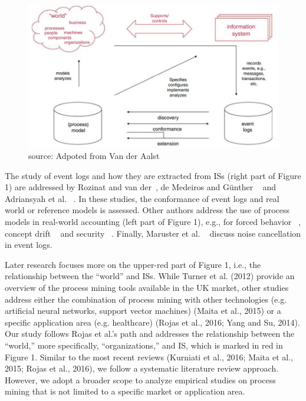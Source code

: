 \begin{figure}[!htb]
    \centering 
    \includegraphics[scale=0.7]{resource/BPMJ.JPG}
    \caption{source: Adpoted from Van der Aalst ~\cite{van2011process}}
    \label{figure:BPMJ}
\end{figure}



The study of event logs and how they are extracted from ISs (right part of Figure 1) are addressed by Rozinat and van der~\cite{rozinat2006decision}, de Medeiros and Günther ~\cite{de2005process} and Adriansyah et al. ~\cite{adriansyah2011conformance}. In these studies, the conformance of event logs and real world or reference models is assessed. Other authors address the use of process models in real-world accounting (left part of Figure 1), e.g., for forced behavior ~\cite{wen2009novel}, concept drift ~\cite{engel2014case} and security ~\cite{van2005process}. Finally, Maruster et al. ~\cite{muarucster2006rule} discuss noise cancellation in event logs.

Later research focuses more on the upper-red part of Figure 1, i.e., the relationship between the “world” and ISs. While Turner et al. (2012) provide an overview of the process mining tools available in the UK market, other studies address either the combination of process mining with other technologies (e.g. artificial neural networks, support vector machines) (Maita et al., 2015) or a specific application area (e.g. healthcare) (Rojas et al., 2016; Yang and Su, 2014). Our study follows Rojas et al.’s path and addresses the relationship between the “world,” more specifically, “organizations,” and IS, which is marked in red in Figure 1. Similar to the most recent reviews (Kurniati et al., 2016; Maita et al., 2015; Rojas et al., 2016), we follow a systematic literature review approach. However, we adopt a broader scope to analyze empirical studies on process mining that is not limited to a specific market or application area.





